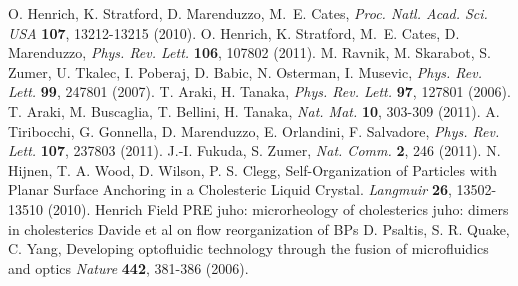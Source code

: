\documentclass[12pt]{article}
\begin{document}
\begin{thebibliography}{99}
 O. Henrich, K. Stratford, D. Marenduzzo, M.~E. Cates,
{\it Proc. Natl. Acad. Sci. USA} {\bf 107}, 13212-13215 (2010).
 O. Henrich, K. Stratford, M.~E. Cates, D. Marenduzzo,
{\it Phys. Rev. Lett.} {\bf 106}, 107802 (2011).
 M. Ravnik, M. Skarabot, S. Zumer, U. Tkalec, I. Poberaj, D. Babic, N. Osterman, I. Musevic, {\it Phys. Rev. Lett.} {\bf 99}, 247801 (2007).
 T. Araki, H. Tanaka, {\it Phys. Rev. Lett.} {\bf 97}, 
127801 (2006).
 T. Araki, M. Buscaglia, T. Bellini, H. Tanaka,
{\it Nat. Mat.} {\bf 10}, 303-309 (2011).
 A. Tiribocchi, G. Gonnella, D. Marenduzzo, E. Orlandini,
F. Salvadore, {\it Phys. Rev. Lett.} {\bf 107}, 237803 (2011).
 J.-I. Fukuda, S. Zumer, {\it Nat. Comm.} {\bf 2}, 246 (2011).
 N. Hijnen, T. A. Wood, D. Wilson, P. S. Clegg, 
Self-Organization of Particles with Planar Surface Anchoring in a Cholesteric
 Liquid Crystal. {\it Langmuir} {\bf 26}, 13502-13510 (2010).
 Henrich Field PRE 
 juho: microrheology of cholesterics
 juho: dimers in cholesterics
 Davide et al on flow reorganization of BPs
 D. Psaltis, S. R. Quake, C. Yang, Developing optofluidic technology through the fusion of microfluidics and optics {\it Nature} {\bf 442}, 381-386 (2006).

\end{thebibliography}

\newpage
\end{document}
